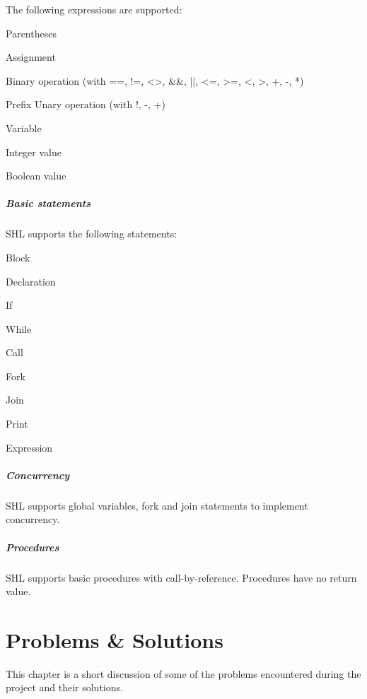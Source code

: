 \documentclass[twoside]{report}
\begin{document}
The following expressions are supported:
\begin{compactitem}
	\item Parentheses
	\item Assignment
	\item Binary operation (with ==, !=, <>, \&\&, ||, <=, >=, <, >, +, -, *)
	\item Prefix Unary operation (with !, -, +)
	\item Variable
	\item Integer value
	\item Boolean value
\end{compactitem}
\paragraph{Basic statements} SHL supports the following statements: 
\begin{compactitem}
	\item Block
	\item Declaration
	\item If 
	\item While
	\item Call
	\item Fork 
	\item Join
	\item Print
	\item Expression
\end{compactitem}
\paragraph{Concurrency} SHL supports global variables, fork and join statements to implement concurrency.
\paragraph{Procedures} SHL supports basic procedures with call-by-reference. Procedures have no return value.


\chapter{Problems \& Solutions}
\label{problems_and_solutions}
This chapter is a short discussion of some of the problems encountered during the project and their solutions.
\end{document}
